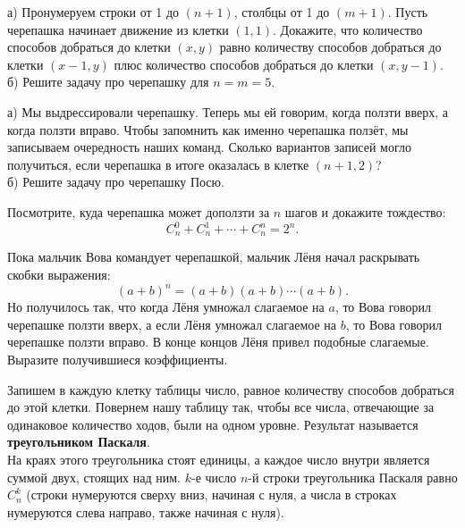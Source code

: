 \begin{problems}
 
\item а) Пронумеруем строки от 1 до $(n+1)$, столбцы от 1 до $(m+1)$. Пусть черепашка начинает движение из клетки $(1, 1)$. Докажите, что количество способов добраться до клетки $(x, y)$ равно количеству способов добраться до клетки $(x-1, y)$ плюс количество способов добраться до клетки $(x, y-1)$.\\
б) Решите задачу про черепашку для $n=m=5$.

\item а) Мы выдрессировали черепашку. Теперь мы ей говорим, когда ползти вверх, а когда ползти вправо. Чтобы запомнить как именно черепашка ползёт, мы записываем очередность наших команд. Сколько вариантов записей могло получиться, если черепашка в итоге оказалась в клетке $(n+1, 2)$?\\
б) Решите задачу про черепашку Посю.

\item Посмотрите, куда черепашка может доползти за $n$ шагов и докажите тождество:
$$C_n^0+C_n^1+\cdots+C_n^n=2^n.$$

\item Пока мальчик Вова командует черепашкой, мальчик Лёня начал раскрывать скобки выражения:
$$(a+b)^n=(a+b)(a+b)\cdots (a+b).$$
Но получилось так, что когда Лёня умножал слагаемое на $a$, то Вова говорил черепашке ползти вверх, а если Лёня умножал слагаемое на $b$, то Вова говорил черепашке ползти вправо. В конце концов Лёня привел подобные слагаемые. Выразите получившиеся коэффициенты. 
\end{problems}

Запишем в каждую клетку таблицы число, равное количеству способов добраться до этой клетки. Повернем нашу таблицу так, чтобы все числа, отвечающие за одинаковое количество ходов, были на одном уровне. Результат называется\\ \textbf{треугольником Паскаля}.\\ 
На краях этого треугольника стоят единицы, а каждое число внутри является суммой двух, стоящих над ним. $k$-е число $n$-й строки треугольника Паскаля равно $C_n^k$ (строки нумеруются сверху вниз, начиная с нуля, а числа в строках нумеруются слева направо, также начиная с нуля).

\begin{figure}[h!]
\end{figure}

